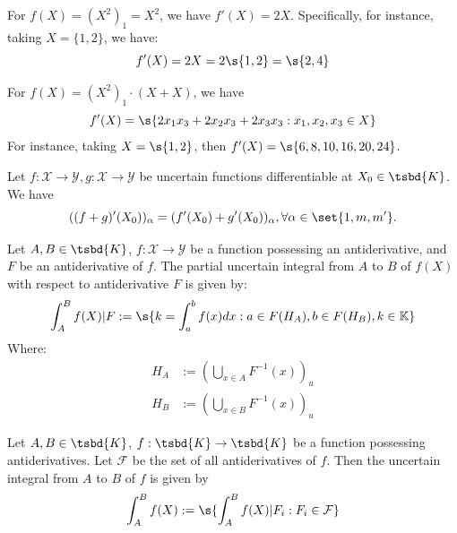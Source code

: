 \begin{example}
	For $f(X) = (X^2)_1 = X^2 $, we have $f'(X) = 2X$. Specifically, for instance, taking $X = \{1,2\}$, we have:
	$$f'(X) = 2X = 2 \s{1,2} = \s{2,4}$$
\end{example}
\begin{example}
	For $f(X)= (X^2)_1\cdot (X+X)$, we have \[f'(X) = \s{2x_1x_3+2x_2x_3+2x_3x_3 : x_1,x_2,x_3 \in X}\]
	For instance, taking $X=\s{1,2}$, then $f'(X) = \s{6, 8, 10, 16, 20, 24}$.
\end{example}
\begin{theorem}
	Let $f : \mathcal{X} \to \mathcal{Y}, g : \mathcal{X} \to \mathcal{Y}$ be uncertain functions differentiable at $X_0 \in \tsbd{K}$. We have \[
		((f+g)'(X_0))_\alpha = (f'(X_0) + g'(X_0))_\alpha, \forall \alpha \in \set{1,m,m'}.
	\]
\end{theorem}
\begin{definition}
	Let $A,B \in \tsbd{K}$, $f: \mathcal{X} \to \mathcal{Y}$ be a function possessing an antiderivative, and $F$ be an antiderivative of $f$. The partial uncertain integral from $A$ to $B$ of $f(X)$ with respect to antiderivative $F$ is given by:
	\[
		\int_{A}^{B}{f(X)|F} := \s{k = \int_{a}^{b}f(x)dx : a \in F(H_A), b \in F(H_B), k \in \mathbb{K}}
	\]
	Where:
	\begin{align*}
		H_A &:= \left(\bigcup_{x \in A}{F^{-1}(x)}\right)_u \\
		H_B &:= \left(\bigcup_{x \in B}{F^{-1}(x)}\right)_u
	\end{align*}
\end{definition}
\begin{definition}
	Let $A,B \in \tsbd{K}$, $f: \tsbd{K} \to \tsbd{K}$ be a function possessing antiderivatives. Let $\mathcal{F}$ be the set of all antiderivatives of $f$. Then the uncertain integral from $A$ to $B$ of $f$ is given by \[
	\int_{A}^{B}{f(X)} := \s{\int_{A}^{B}f(X)|F_i : F_i \in \mathcal{F}}
	\]
\end{definition}
